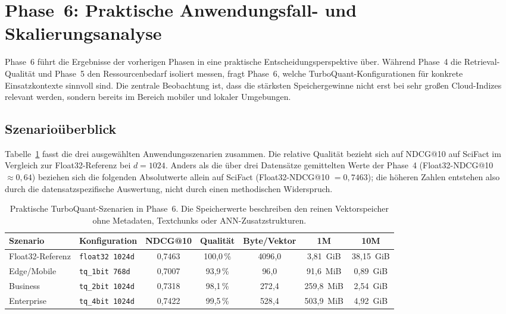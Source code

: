 \section{Phase~6: Praktische Anwendungsfall- und Skalierungsanalyse}
\label{sec:ergebnisse_phase6}
%
Phase~6 führt die Ergebnisse der vorherigen Phasen in eine praktische Entscheidungsperspektive über.
Während Phase~4 die Retrieval-Qualität und Phase~5 den Ressourcenbedarf isoliert messen, fragt Phase~6, welche TurboQuant-Konfigurationen für konkrete Einsatzkontexte sinnvoll sind.
Die zentrale Beobachtung ist, dass die stärksten Speichergewinne nicht erst bei sehr großen Cloud-Indizes relevant werden, sondern bereits im Bereich mobiler und lokaler Umgebungen.
%
\subsection{Szenarioüberblick}
%
Tabelle~\ref{tab:phase6_scenarios} fasst die drei ausgewählten Anwendungsszenarien zusammen.
Die relative Qualität bezieht sich auf NDCG@10 auf SciFact im Vergleich zur Float32-Referenz bei $d = 1024$.
Anders als die über drei Datensätze gemittelten Werte der Phase~4 (Float32-NDCG@10 $\approx 0{,}64$) beziehen sich die folgenden Absolutwerte allein auf SciFact (Float32-NDCG@10 $= 0{,}7463$); die höheren Zahlen entstehen also durch die datensatzspezifische Auswertung, nicht durch einen methodischen Widerspruch.
%
\begin{table}[htbp]
  \centering
  \small
  \caption[Praktische TurboQuant-Szenarien in Phase~6]{Praktische TurboQuant-Szenarien in Phase~6. Die Speicherwerte beschreiben den reinen Vektorspeicher ohne Metadaten, Textchunks oder ANN-Zusatzstrukturen.}
  \label{tab:phase6_scenarios}
  \begin{tabular}{llccccc}
    \toprule
    Szenario & Konfiguration & NDCG@10 & Qualität & Byte/Vektor & 1M & 10M \\
    \midrule
    Float32-Referenz & \texttt{float32 1024d} & 0{,}7463 & 100{,}0\,\% & 4096{,}0 & 3{,}81~GiB & 38{,}15~GiB \\
    Edge/Mobile & \texttt{tq\_1bit 768d} & 0{,}7007 & 93{,}9\,\% & 96{,}0 & 91{,}6~MiB & 0{,}89~GiB \\
    Business & \texttt{tq\_2bit 1024d} & 0{,}7318 & 98{,}1\,\% & 272{,}4 & 259{,}8~MiB & 2{,}54~GiB \\
    Enterprise & \texttt{tq\_4bit 1024d} & 0{,}7422 & 99{,}5\,\% & 528{,}4 & 503{,}9~MiB & 4{,}92~GiB \\
    \bottomrule
  \end{tabular}
\end{table}
